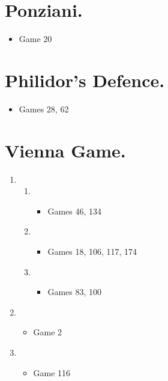 \section{Ponziani.}
\newgame{}
\begin{itemize}
\item Game 20
\end{itemize}

\section{Philidor's Defence.}
\newgame{}
\begin{itemize}
\item Games 28, 62
\end{itemize}

\section{Vienna Game.}
\newgame{}
\begin{enumerate}
\item {}
\begin{enumerate}
\item {}
\begin{itemize}
\item Games 46, 134
\end{itemize}
\item {}
\begin{itemize}
\item Games 18, 106, 117, 174
\end{itemize}
\item {}
\begin{itemize}
\item Games 83, 100
\end{itemize}
\end{enumerate}
\item {}
\begin{itemize}
\item Game 2
\end{itemize}
\item {}
\begin{itemize}
\item Game 116
\end{itemize}
\end{enumerate}

